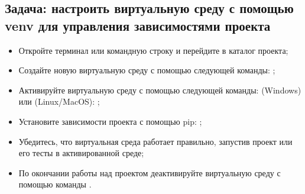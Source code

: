 \documentclass[letterpaper,10pt,russian]{sphinxmanual}
\begin{document}
\subsection{Задача: настроить виртуальную среду с помощью venv для управления зависимостями проекта}
\label{\detokenize{educational_materials/path_venv/exercises:id2}}\begin{itemize}
\item {} 
\sphinxAtStartPar
Откройте терминал или командную строку и перейдите в каталог проекта;

\item {} 
\sphinxAtStartPar
Создайте новую виртуальную среду с помощью следующей команды: ;

\item {} 
\sphinxAtStartPar
Активируйте виртуальную среду с помощью следующей команды: (Windows)  или (Linux/MacOS): ;

\item {} 
\sphinxAtStartPar
Установите зависимости проекта с помощью pip: ;

\item {} 
\sphinxAtStartPar
Убедитесь, что виртуальная среда работает правильно, запустив проект или его тесты в активированной среде;

\item {} 
\sphinxAtStartPar
По окончании работы над проектом деактивируйте виртуальную среду с помощью команды .

\end{itemize}
\end{document}
